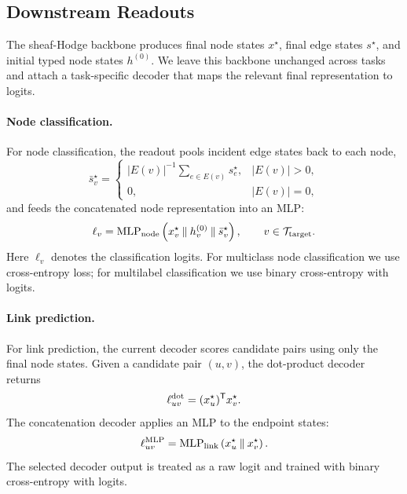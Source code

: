 \subsection{Downstream Readouts}
\label{sec:readouts}

The sheaf-Hodge backbone produces final node states \(x^\star\), final edge states
\(s^\star\), and initial typed node states \(h^{(0)}\).  We leave this backbone unchanged across
tasks and attach a task-specific decoder that maps the relevant final representation to logits.

\paragraph{Node classification.}
For node classification, the readout pools incident edge states back to each node,
\begin{equation}
  \bar s_v^\star
  =
  \begin{cases}
    |E(v)|^{-1}\sum_{e\in E(v)}s_e^\star, & |E(v)|>0,\\
    0, & |E(v)|=0 ,
  \end{cases}
  \label{eq:node-edge-summary}
\end{equation}
and feeds the concatenated node representation into an MLP:
\begin{equation}
  \ell_v
  =
  \operatorname{MLP}_{\mathrm{node}}
  \left(
    x_v^\star\mathbin\Vert h_v^{(0)}\mathbin\Vert\bar s_v^\star
  \right),
  \qquad v\in\mathcal{T}_{\mathrm{target}} .
  \label{eq:node-readout}
\end{equation}
Here \(\ell_v\) denotes the classification logits.  For multiclass node classification we use
cross-entropy loss; for multilabel classification we use binary cross-entropy with logits.

\paragraph{Link prediction.}
For link prediction, the current decoder scores candidate pairs using only the final node states.
Given a candidate pair \((u,v)\), the dot-product decoder returns
\begin{equation}
  \ell_{uv}^{\mathrm{dot}}
  =
  (x_u^\star)^{\mathsf{T}}x_v^\star .
  \label{eq:link-dot}
\end{equation}
The concatenation decoder applies an MLP to the endpoint states:
\begin{equation}
  \ell_{uv}^{\mathrm{MLP}}
  =
  \operatorname{MLP}_{\mathrm{link}}
  \left(x_u^\star\mathbin\Vert x_v^\star\right).
  \label{eq:link-mlp}
\end{equation}
The selected decoder output is treated as a raw logit and trained with binary cross-entropy with
logits.

